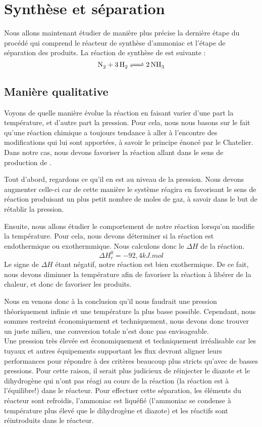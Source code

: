\documentclass[10pt,a4paper]{article}
\begin{document}
\section{Synthèse  et séparation}

Nous allons maintenant étudier de manière plus précise la dernière étape du procédé qui comprend le réacteur de synthèse d’ammoniac et l'étape de séparation des produits.
La réaction de synthèse de  est suivante :
$$ \ce{N_2 + 3H2 <=> 2NH3}$$

\subsection{Manière qualitative}

Voyons de quelle manière évolue la réaction en faisant varier d'une part la température, et d'autre part la pression. Pour cela, nous nous basons sur le fait qu'une réaction chimique a toujours tendance à   aller à l'encontre des modifications qui lui sont apportées, à savoir le principe énoncé par le Chatelier. Dans notre cas, nous devons favoriser la réaction allant dans le sens de production de .

Tout d'abord, regardons ce qu'il en est au niveau de la pression. Nous devons augmenter celle-ci car de cette manière le système réagira en favorisant le sens de réaction produisant un plus petit nombre de moles de gaz, à savoir  dans le but de rétablir la pression. 

Ensuite, nous allons étudier le comportement de notre réaction lorsqu'on modifie la température. Pour cela, nous devons déterminer si la réaction est endothermique ou exothermmique. Nous calculons donc le $\Delta H$  de la réaction. $$\Delta H^0_r = \unit{-92,4}{kJ.mol}$$
Le signe de $\Delta H$ étant négatif, notre réaction est bien exothermique. De ce fait, nous devons diminuer la température afin de favoriser la réaction à libérer de la chaleur, et donc de favoriser les produits.

Nous en venons donc à la conclusion qu'il nous faudrait une pression théoriquement infinie et une température la plus basse possible. Cependant, nous sommes restreint économiquement et techniquement, nous devons donc trouver un juste milieu, une conversion totale n'est donc pas envisageable. 
\\

Une pression très élevée est économiquement et techniquement irréalisable car les tuyaux et autres équipements supportant les flux devront aligner leurs performances pour répondre à des critères beaucoup plus stricts qu'avec de basses pressions.
Pour cette raison, il serait plus judicieux de réinjecter  le diazote et le dihydrogène qui n'ont pas réagi au cours de la réaction (la réaction est à l'équilibre!) dans le réacteur. Pour effectuer cette séparation, les éléments du réacteur sont refroidis, l'ammoniac est liquéfié (l'ammoniac se condense à température plus élevé que le dihydrogène et diazote) et les réactifs sont réintroduits dans le réacteur.
\end{document}
